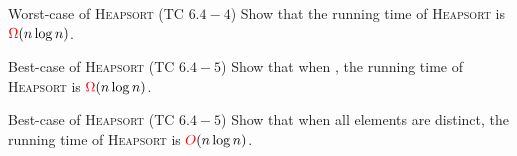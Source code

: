 \begin{frame}{}
  \begin{exampleblock}{Worst-case of \textsc{Heapsort} (TC $6.4-4$)}
    Show that the  running time of \textsc{Heapsort} is $\textcolor{red}{\Omega}(n \log n)$.
  \end{exampleblock}

  \pause
  \vspace{0.50cm}
  \centerline{}

  \pause
  \vspace{0.50cm}
  \centerline{}

  \pause
  \vspace{0.50cm}
  \centerline{}

  \pause
  \vspace{0.50cm}
\end{frame}

\begin{frame}{}
  \begin{exampleblock}{Best-case of \textsc{Heapsort} (TC $6.4-5$)}
    Show that when , 
    the  running time of \textsc{Heapsort} is $\textcolor{red}{\Omega}(n \log n)$.
  \end{exampleblock}

  \pause
\end{frame}

\begin{frame}{}
  \begin{exampleblock}{Best-case of \textsc{Heapsort} (TC $6.4-5$)}
    Show that when all elements are distinct, 
    the  running time of \textsc{Heapsort} is $\textcolor{red}{O}(n \log n)$.
  \end{exampleblock}

  \pause
  \centerline{}
\end{frame}
